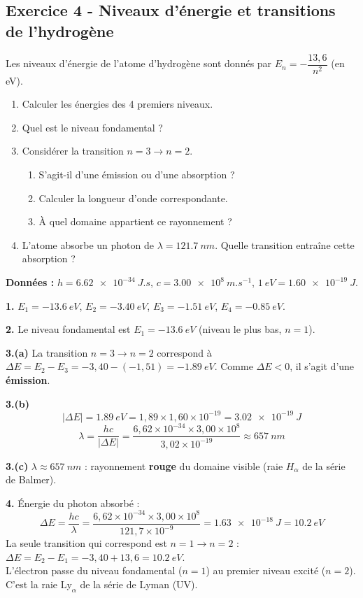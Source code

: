 \documentclass[12pt,a4paper]{article}
\begin{document}
\subsection*{Exercice 4 - Niveaux d'énergie et transitions de l'hydrogène \niveau{\moyen}}

\begin{boiteexercice}
Les niveaux d'énergie de l'atome d'hydrogène sont donnés par $E_n = -\dfrac{13{,}6}{n^2}$ (en eV).

\begin{enumerate}
  \item Calculer les énergies des 4 premiers niveaux.
  \item Quel est le niveau fondamental ?
  \item Considérer la transition $n=3 \to n=2$.
    \begin{enumerate}[label=(\alph*)]
      \item S'agit-il d'une émission ou d'une absorption ?
      \item Calculer la longueur d'onde correspondante.
      \item À quel domaine appartient ce rayonnement ?
    \end{enumerate}
  \item L'atome absorbe un photon de $\lambda = \qty{121.7}{nm}$. Quelle transition entraîne cette absorption ?
\end{enumerate}

\textbf{Données :} $h = \qty{6.62e-34}{J.s}$, $c = \qty{3.00e8}{m.s^{-1}}$, $\qty{1}{eV} = \qty{1.60e-19}{J}$.
\end{boiteexercice}

\begin{boitecorrige}
\textbf{1.} $E_1 = \qty{-13.6}{eV}$, $E_2 = \qty{-3.40}{eV}$, $E_3 = \qty{-1.51}{eV}$, $E_4 = \qty{-0.85}{eV}$.

\textbf{2.} Le niveau fondamental est $E_1 = \qty{-13.6}{eV}$ (niveau le plus bas, $n=1$).

\textbf{3.(a)} La transition $n=3 \to n=2$ correspond à $\Delta E = E_2 - E_3 = -3{,}40 - (-1{,}51) = \qty{-1.89}{eV}$. Comme $\Delta E < 0$, il s'agit d'une \textbf{émission}.

\textbf{3.(b)}
\[
|\Delta E| = \qty{1.89}{eV} = 1{,}89 \times 1{,}60\times10^{-19} = \qty{3.02e-19}{J}
\]
\[
\lambda = \frac{hc}{|\Delta E|} = \frac{6{,}62\times10^{-34}\times3{,}00\times10^8}{3{,}02\times10^{-19}} \approx \qty{657}{nm}
\]

\textbf{3.(c)} $\lambda \approx \qty{657}{nm}$ : rayonnement \textbf{rouge} du domaine visible (raie $H_\alpha$ de la série de Balmer).

\textbf{4.} Énergie du photon absorbé :
\[
\Delta E = \frac{hc}{\lambda} = \frac{6{,}62\times10^{-34}\times3{,}00\times10^8}{121{,}7\times10^{-9}} = \qty{1.63e-18}{J} = \qty{10.2}{eV}
\]
La seule transition qui correspond est $n=1 \to n=2$ : $\Delta E = E_2 - E_1 = -3{,}40 + 13{,}6 = \qty{10.2}{eV}$. \\
L'électron passe du niveau fondamental ($n=1$) au premier niveau excité ($n=2$). C'est la raie $\text{Ly}_\alpha$ de la série de Lyman (UV).
\end{boitecorrige}
\end{document}
